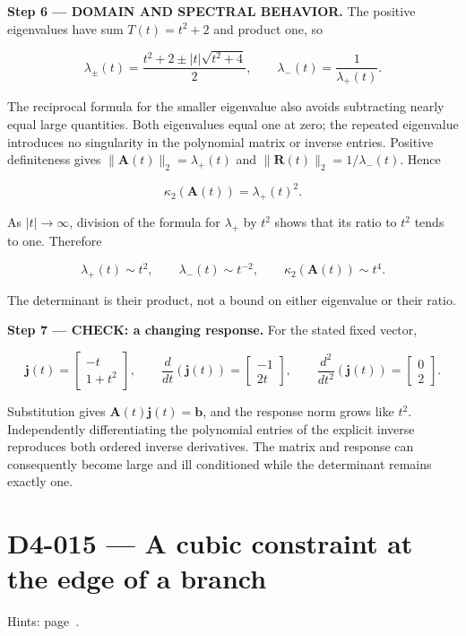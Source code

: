 \documentclass[11pt,oneside,openany]{book}
\begin{document}
\endgroup
\begin{DomainStep}
\textbf{Step 6 --- DOMAIN AND SPECTRAL BEHAVIOR.} The positive eigenvalues have sum \(T(t)=t^2+2\) and product one, so

\[
\lambda_\pm(t)=\frac{t^2+2\pm|t|\sqrt{t^2+4}}2,
\qquad
\lambda_-(t)=\frac1{\lambda_+(t)}.
\]

The reciprocal formula for the smaller eigenvalue also avoids subtracting nearly equal large quantities. Both eigenvalues equal one at zero; the repeated eigenvalue introduces no singularity in the polynomial matrix or inverse entries. Positive definiteness gives \(\|\mathbf A(t)\|_2=\lambda_+(t)\) and \(\|\mathbf R(t)\|_2=1/\lambda_-(t)\). Hence

\[
\kappa_2(\mathbf A(t))=\lambda_+(t)^2.
\]

As \(|t|\to\infty\), division of the formula for \(\lambda_+\) by \(t^2\) shows that its ratio to \(t^2\) tends to one. Therefore

\[
\lambda_+(t)\sim t^2,\qquad
\lambda_-(t)\sim t^{-2},\qquad
\kappa_2(\mathbf A(t))\sim t^4.
\]

The determinant is their product, not a bound on either eigenvalue or their ratio.

\end{DomainStep}
\textbf{Step 7 --- CHECK: a changing response.} For the stated fixed vector,

\[
\mathbf j(t)=\begin{bmatrix}-t\\1+t^2\end{bmatrix},\qquad
\frac{d}{dt}\left(\mathbf j(t)\right)=\begin{bmatrix}-1\\2t\end{bmatrix},\qquad
\frac{d^2}{dt^2}\left(\mathbf j(t)\right)=\begin{bmatrix}0\\2\end{bmatrix}.
\]

Substitution gives \(\mathbf A(t)\mathbf j(t)=\mathbf b\), and the response norm grows like \(t^2\). Independently differentiating the polynomial entries of the explicit inverse reproduces both ordered inverse derivatives. The matrix and response can consequently become large and ill conditioned while the determinant remains exactly one.
\clearpage
\section{D4-015 --- A cubic constraint at the edge of a branch}
\label{problem:D4-015}
{\small Hints: page~\pageref{hints:D4-015}.}\par\medskip
\end{document}
